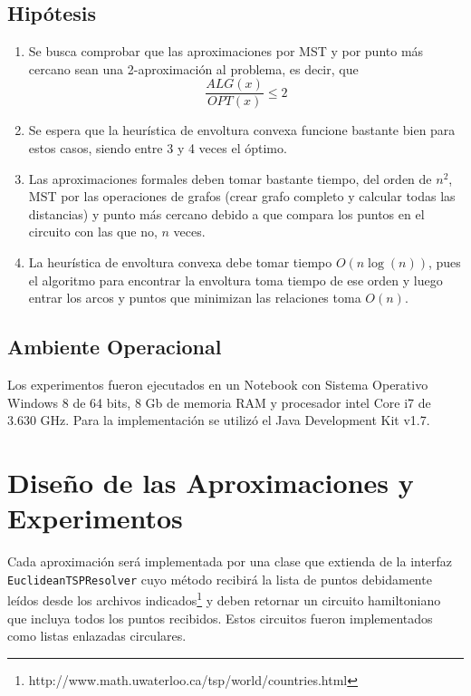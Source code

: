 \documentclass[12pt,letterpaper, margin = 3cm]{article}
\begin{document}
\subsection{Hipótesis}
\begin{enumerate}
\item Se busca comprobar que las aproximaciones por MST y por punto más cercano sean una 2-aproximación al problema, es decir, que \[ \frac{ALG(x)}{OPT(x)}\leq 2 \]
\item Se espera que la heurística de envoltura convexa funcione bastante bien para estos casos, siendo entre 3 y 4 veces el óptimo.
\item Las aproximaciones formales deben tomar bastante tiempo, del orden de $n^2$, MST por las operaciones de grafos (crear grafo completo y calcular todas las distancias) y punto más cercano debido a que compara los puntos en el circuito con las que no, $n$ veces.
\item La heurística de envoltura convexa debe tomar tiempo $O(n\log(n))$, pues el algoritmo para encontrar la envoltura toma tiempo de ese orden y luego entrar los arcos y puntos que minimizan las relaciones toma $O(n)$. 
\end{enumerate}

\subsection{Ambiente Operacional}
Los experimentos fueron ejecutados en un Notebook con Sistema Operativo Windows 8 de 64 bits, 8 Gb de
memoria RAM y procesador intel Core i7 de 3.630 GHz. Para la implementación se utilizó el Java Development Kit v1.7.

\newpage
\section{Diseño de las Aproximaciones y Experimentos}
Cada aproximación será implementada por una clase que extienda de la interfaz \verb+EuclideanTSPResolver+ cuyo método recibirá la lista de puntos debidamente leídos desde los archivos indicados\footnote{http://www.math.uwaterloo.ca/tsp/world/countries.html} y deben retornar un circuito hamiltoniano que incluya todos los puntos recibidos. Estos circuitos fueron implementados como listas enlazadas circulares.
\end{document}
